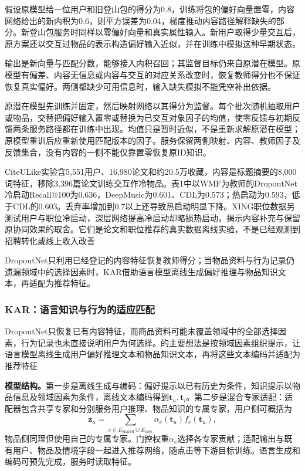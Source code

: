 假设原模型给一位用户和旧登山包的得分为0.8，训练将包的偏好向量置零，内容网络给出的新内积为0.6，则平方误差为0.04，梯度推动内容路径解释缺失的部分。新登山包服务时同样以零偏好向量和真实属性输入。新用户取得少量交互后，原方案还以交互过物品的表示构造偏好输入近似，并在训练中模拟这种早期状态。

输出是新向量与匹配分数，能够接入内积召回；其监督目标仍来自原潜在模型。原模型有偏差、内容无信息或内容与交互的对应关系改变时，恢复教师得分也不保证恢复真实偏好。两侧都缺少可用信息时，输入缺失模拟不能凭空补出依据。

原潜在模型先训练并固定，然后映射网络以其得分为监督。每个批次随机抽取用户或物品，交替把偏好输入置零或替换为已交互对象因子的均值，使零反馈与初期反馈两条服务路径都在训练中出现。均值只是暂时近似，不是重新求解原潜在模型；原模型重训后应重新使用匹配版本的因子。服务保留两侧映射、内容、教师因子及反馈集合，没有内容的一侧不能仅靠置零恢复原ID知识。

CiteULike实验含5,551用户、16,980论文和约20.5万收藏，内容是标题摘要的8,000词特征，移除3,396篇论文训练交互作冷物品。表1中以WMF为教师的DropoutNet冷启动Recall@100为0.636，DeepMusic为0.601、CDL为0.573；热启动为0.593，低于CDL的0.603。丢弃率增加到0.7以上还导致热启动明显下降。XING职位数据另测试用户与职位冷启动，深层网络提高冷启动却略损热启动，揭示内容补充与保留原协同效果的取舍。它们是论文和职位推荐的真实数据离线实验，不是已经观测到招聘转化或线上收入改善

DropoutNet只利用已经登记的内容特征恢复教师得分；当物品资料与行为记录仍遗漏领域中的选择因素时，KAR借助语言模型离线生成偏好推理与物品知识文本，再适配为推荐特征。

\subsubsection{KAR：语言知识与行为的适应匹配}
\label{sec:rs-kar}

DropoutNet只恢复已有内容特征，而商品资料可能未覆盖领域中的全部选择因素，行为记录也未直接说明用户为何选择。的主要想法是按领域因素组织提示，让语言模型离线生成用户偏好推理文本和物品知识文本，再将这些文本编码并适配为推荐特征

\textbf{模型结构。}第一步是离线生成与编码：偏好提示以已有历史为条件，知识提示以物品信息及领域因素为条件，离线文本编码得到$\bm{t}_u,\bm{t}_i$。第二步是混合专家适配：适配器包含共享专家和分别服务用户推理、物品知识的专属专家，用户侧可概括为
\[
  \bm{z}_u=\sum_{e\in E_{\mathrm{shared}}\cup E_{\mathrm{user}}}
                \alpha_e(\bm{t}_u)f_e(\bm{t}_u),
\]
物品侧同理但使用自己的专属专家。门控权重$\alpha_e$选择各专家贡献；适配输出与既有用户、物品及情境字段一起进入推荐网络，随点击等下游目标训练。语言生成和编码可预先完成，服务时读取特征。

